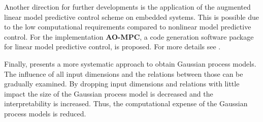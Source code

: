 Another direction for further developments is the application of the augmented linear model predictive control scheme on embedded systems.
This is possible due to the low computational requirements compared to nonlinear model predictive control.
For the implementation \textbf{\textmu AO-MPC}, a code generation software package for linear model predictive control, is proposed.
For more details see \cite{Zometa.2013}.

Finally, \cite{Plate.1999} presents a more systematic approach to obtain Gaussian process models.
The influence of all input dimensions and the relations between those can be gradually examined.
By dropping input dimensions and relations with little impact the size of the Gaussian process model is decreased and the interpretability is increased. 
Thus, the computational expense of the Gaussian process models is reduced.